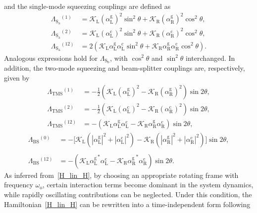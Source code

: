 \documentclass[%
reprint,
floatfix,
superscriptaddress,
amsmath,amssymb,
aps,
pra,
]{revtex4-2}
\newcommand*{\scrpt}[1]{\mathrm{#1}}
\newcommand*{\s}[1]{\ensuremath{_\scrpt{#1}}}
\begin{document}
%
and the single-mode squeezing couplings are defined as
%
\begin{align}
\label{LSH}
\Lambda\s{S\s{a}}^{(1)} & =\mathcal{K}\s{L} (\alpha\mathrm{^{g}_{L}})^2 \sin^2 \theta + \mathcal{K}\s{R} (\alpha\mathrm{^{g}_{R}})^2 \cos^2 \theta, \nonumber \\
%
\Lambda\s{S\s{a}}^{(2)} & = \mathcal{K}\s{L} (\alpha\mathrm{^{c}_{L}})^2 \sin^2 \theta + \mathcal{K}\s{R} (\alpha\mathrm{^{c}_{R}})^2 \cos^2 \theta, \\
%
\Lambda\s{S\s{a}}^{(12)} & = 2 \left( \mathcal{K}\s{L} \alpha\mathrm{^{g}_{L}} \alpha\mathrm{^{c}_{L}} \sin^2 \theta + \mathcal{K}\s{R} \alpha\mathrm{^{g}_{R}} \alpha\mathrm{^{c}_{R}} \cos^2 \theta \right). \nonumber 
\end{align}
%
Analogous expressions hold for $\Lambda\s{S\s{b}}$, with $\cos^2 \theta$ and $\sin^2 \theta$ interchanged.
%
In addition, the two-mode squeezing and beam-splitter couplings are, respectively, given by
%
\begin{align}
\label{LPAH}
\Lambda\s{TMS}^{(1)} & = -\frac{1}{2} \left( \mathcal{K}\s{L} (\alpha\mathrm{^{g}_{L}})^2 - \mathcal{K}\s{R} (\alpha\mathrm{^{g}_{R}})^2 \right) \sin 2\theta,  \nonumber \\
\Lambda\s{TMS}^{(2)} & = -\frac{1}{2} \left( \mathcal{K}\s{L} (\alpha\mathrm{^{c}_{L}})^2 - \mathcal{K}\s{R} (\alpha\mathrm{^{c}_{R}})^2 \right) \sin 2\theta, \\
\Lambda\s{TMS}^{(12)} & = -\left( \mathcal{K}\s{L} \alpha\mathrm{^{g}_{L}} \alpha\mathrm{^{c}_{L}} - \mathcal{K}\s{R} \alpha\mathrm{^{g}_{R}} \alpha\mathrm{^{c}_{R}} \right) \sin 2\theta, \nonumber 
\end{align}
%
\begin{align}
\label{LFCH}
\Lambda\s{BS}^{(0)} & = -\Big[ \mathcal{K}\s{L} \left(|\alpha\mathrm{^{g}_{L}}|^2 + |\alpha\mathrm{^{c}_{L}}|^2 \right) - \mathcal{K}\s{R} \left(|\alpha\mathrm{^{g}_{R}}|^2 + |\alpha\mathrm{^{c}_{R}}|^2 \right) \Big] \sin 2\theta, \nonumber \\
\\
\Lambda\s{BS}^{(12)} & = -\left( \mathcal{K}\s{L} \alpha\mathrm{^{g}_{L}}^* \alpha\mathrm{^{c}_{L}} - \mathcal{K}\s{R} \alpha\mathrm{^{g}_{R}}^* \alpha\mathrm{^{c}_{R}} \right) \sin 2\theta. \nonumber
\end{align}
%
As inferred from~\cref{H_lin_H}, by choosing an appropriate rotating frame with frequency $\omega\s{o}$, certain interaction terms become dominant in the system dynamics, while rapidly oscillating contributions can be neglected. Under this condition, the Hamiltonian~\eqref{H_lin_H} can be rewritten into a time-independent form following
\end{document}
